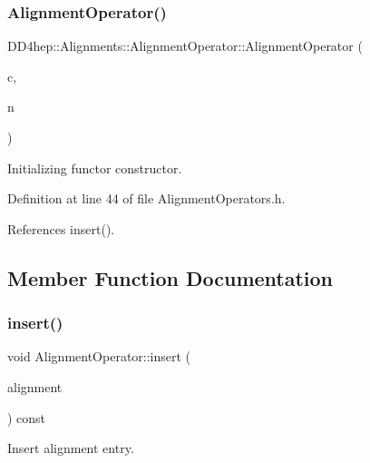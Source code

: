 \subsubsection{\texorpdfstring{Alignment\+Operator()}{AlignmentOperator()}}
{\footnotesize\ttfamily D\+D4hep\+::\+Alignments\+::\+Alignment\+Operator\+::\+Alignment\+Operator (\begin{DoxyParamCaption}\item[{\hyperlink{class_d_d4hep_1_1_alignments_1_1_global_alignment_cache}{Global\+Alignment\+Cache} \&}]{c,  }\item[{\hyperlink{class_d_d4hep_1_1_alignments_1_1_alignment_operator_a2f25eae1d38abc30a09f7a840ab0662a}{Nodes} \&}]{n }\end{DoxyParamCaption})\hspace{0.3cm}{\ttfamily [inline]}}



Initializing functor constructor. 



Definition at line 44 of file Alignment\+Operators.\+h.



References insert().



\subsection{Member Function Documentation}
\hypertarget{class_d_d4hep_1_1_alignments_1_1_alignment_operator_a86d7e0c21834bbaac6cd92861022f944}{}\label{class_d_d4hep_1_1_alignments_1_1_alignment_operator_a86d7e0c21834bbaac6cd92861022f944} 
\subsubsection{\texorpdfstring{insert()}{insert()}}
{\footnotesize\ttfamily void Alignment\+Operator\+::insert (\begin{DoxyParamCaption}\item[{\hyperlink{class_d_d4hep_1_1_alignments_1_1_global_alignment}{Global\+Alignment}}]{alignment }\end{DoxyParamCaption}) const}



Insert alignment entry. 



